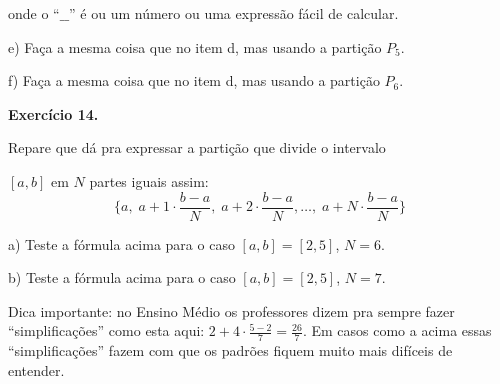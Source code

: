\documentclass[oneside,12pt]{article}
\begin{document}
onde o ``$\_\_$'' é ou um número ou uma expressão fácil de calcular.

\msk

e) Faça a mesma coisa que no item d, mas usando a partição $P_5$.

f) Faça a mesma coisa que no item d, mas usando a partição $P_6$.




\newpage

{\bf Exercício 14.}

\ssk

Repare que dá pra expressar a partição que divide o intervalo

$[a,b]$ em $N$ partes iguais assim:
%
$$\{a, \; a+1·\frac{b-a}{N},
       \; a+2·\frac{b-a}{N}, \ldots,
       \; a+N·\frac{b-a}{N}\}
$$

a) Teste a fórmula acima para o caso $[a,b]=[2,5]$, $N=6$.

b) Teste a fórmula acima para o caso $[a,b]=[2,5]$, $N=7$.

\msk

Dica importante: no Ensino Médio os professores dizem pra sempre fazer
``simplificações'' como esta aqui: $2 + 4·\frac{5-2}{7} =
\frac{26}{7}$. Em casos como a acima essas ``simplificações'' fazem
com que os padrões fiquem muito mais difíceis de entender.

\newpage

% 
% 
% 
% 
% 
% 
% 
% 
% 
% 
% 
% 
% 
% 
% 
% 
% 
% 
% 
% 
% 
% 
% 
% 
\end{document}
